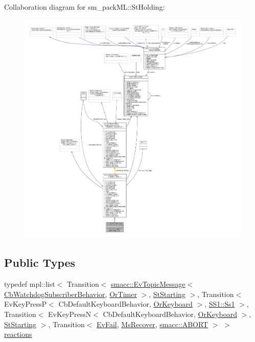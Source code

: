 Collaboration diagram for sm\+\_\+pack\+ML\+:\+:St\+Holding\+:
\nopagebreak
\begin{figure}[H]
\begin{center}
\leavevmode
\includegraphics[width=350pt]{structsm__packML_1_1StHolding__coll__graph}
\end{center}
\end{figure}
\subsection*{Public Types}
\begin{DoxyCompactItemize}
\item 
typedef mpl\+::list$<$ Transition$<$ \hyperlink{structsmacc_1_1default__events_1_1EvTopicMessage}{smacc\+::\+Ev\+Topic\+Message}$<$ \hyperlink{classsm__packML_1_1cl__subscriber_1_1CbWatchdogSubscriberBehavior}{Cb\+Watchdog\+Subscriber\+Behavior}, \hyperlink{classsm__packML_1_1OrTimer}{Or\+Timer} $>$, \hyperlink{structsm__packML_1_1StStarting}{St\+Starting} $>$, Transition$<$ Ev\+Key\+PressP$<$ Cb\+Default\+Keyboard\+Behavior, \hyperlink{classsm__packML_1_1OrKeyboard}{Or\+Keyboard} $>$, \hyperlink{structsm__packML_1_1SS1_1_1Ss1}{S\+S1\+::\+Ss1} $>$, Transition$<$ Ev\+Key\+PressN$<$ Cb\+Default\+Keyboard\+Behavior, \hyperlink{classsm__packML_1_1OrKeyboard}{Or\+Keyboard} $>$, \hyperlink{structsm__packML_1_1StStarting}{St\+Starting} $>$, Transition$<$ \hyperlink{structsm__packML_1_1EvFail}{Ev\+Fail}, \hyperlink{classsm__packML_1_1MsRecover}{Ms\+Recover}, \hyperlink{structsmacc_1_1default__transition__tags_1_1ABORT}{smacc\+::\+A\+B\+O\+RT} $>$ $>$ \hyperlink{structsm__packML_1_1StHolding_ae019299606866ec931fbc4133ea95a6a}{reactions}
\end{DoxyCompactItemize}
